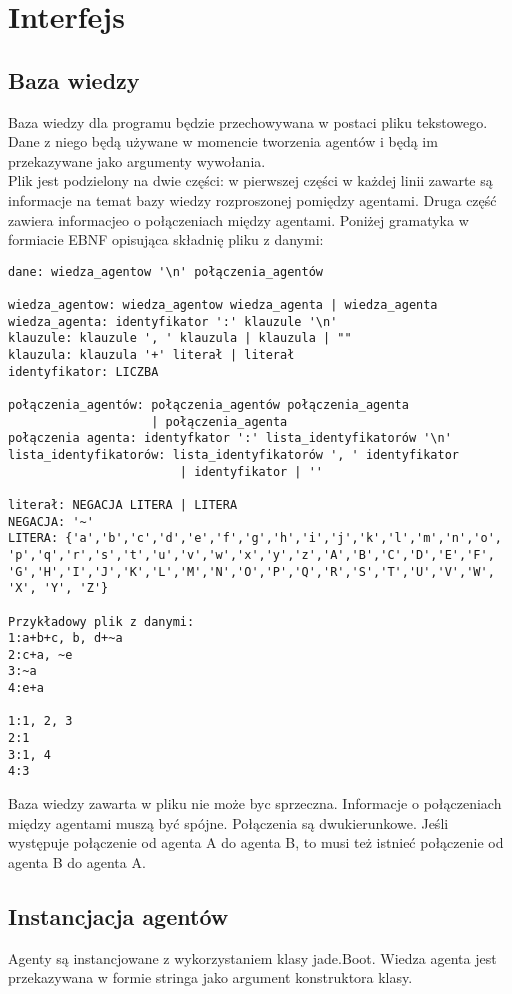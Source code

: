 \documentclass[a4paper,12pt]{mwart}
\begin{document}
\section{Interfejs}
\subsection{Baza wiedzy}
Baza wiedzy dla programu będzie przechowywana w postaci pliku tekstowego. Dane z niego będą używane w momencie tworzenia agentów i będą im przekazywane jako argumenty wywołania.
\\
Plik jest podzielony na dwie części: w pierwszej części w każdej linii zawarte są informacje na temat bazy wiedzy rozproszonej pomiędzy agentami. Druga część zawiera informacjeo o połączeniach między agentami. Poniżej gramatyka w formiacie EBNF opisująca składnię pliku z danymi:

\begin{verbatim}
dane: wiedza_agentow '\n' połączenia_agentów

wiedza_agentow: wiedza_agentow wiedza_agenta | wiedza_agenta
wiedza_agenta: identyfikator ':' klauzule '\n'
klauzule: klauzule ', ' klauzula | klauzula | ""
klauzula: klauzula '+' literał | literał
identyfikator: LICZBA

połączenia_agentów: połączenia_agentów połączenia_agenta 
					| połączenia_agenta
połączenia agenta: identyfkator ':' lista_identyfikatorów '\n'
lista_identyfikatorów: lista_identyfikatorów ', ' identyfikator 
						| identyfikator | ''

literał: NEGACJA LITERA | LITERA
NEGACJA: '~' 
LITERA: {'a','b','c','d','e','f','g','h','i','j','k','l','m','n','o',
'p','q','r','s','t','u','v','w','x','y','z','A','B','C','D','E','F',
'G','H','I','J','K','L','M','N','O','P','Q','R','S','T','U','V','W',
'X', 'Y', 'Z'}

Przykładowy plik z danymi:
1:a+b+c, b, d+~a
2:c+a, ~e
3:~a
4:e+a

1:1, 2, 3
2:1
3:1, 4
4:3
\end{verbatim}

Baza wiedzy zawarta w pliku nie może byc sprzeczna. Informacje o połączeniach między agentami muszą być spójne. Połączenia są dwukierunkowe. Jeśli występuje połączenie od agenta A do agenta B, to musi też istnieć połączenie od agenta B do agenta A. 

\subsection{Instancjacja agentów}
Agenty są instancjowane z wykorzystaniem klasy jade.Boot. Wiedza agenta jest przekazywana w formie stringa jako argument konstruktora klasy.
\end{document}
